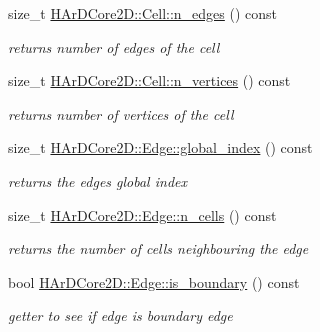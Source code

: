 \begin{DoxyCompactItemize}
\mbox{\label{group__Mesh_ga1b0586610a05e1a7a64bbe11f59e9b19}} 
size\+\_\+t \hyperlink{group__Mesh_ga1b0586610a05e1a7a64bbe11f59e9b19}{H\+Ar\+D\+Core2\+D\+::\+Cell\+::n\+\_\+edges} () const
\begin{DoxyCompactList}\small\item\em returns number of edges of the cell \end{DoxyCompactList}\item 
\mbox{\label{group__Mesh_ga70f9744e4ff553db7f0e147342319f43}} 
size\+\_\+t \hyperlink{group__Mesh_ga70f9744e4ff553db7f0e147342319f43}{H\+Ar\+D\+Core2\+D\+::\+Cell\+::n\+\_\+vertices} () const
\begin{DoxyCompactList}\small\item\em returns number of vertices of the cell \end{DoxyCompactList}\item 
\mbox{\label{group__Mesh_ga774e975ebad5e6bdccf549215293d624}} 
size\+\_\+t \hyperlink{group__Mesh_ga774e975ebad5e6bdccf549215293d624}{H\+Ar\+D\+Core2\+D\+::\+Edge\+::global\+\_\+index} () const
\begin{DoxyCompactList}\small\item\em returns the edges global index \end{DoxyCompactList}\item 
\mbox{\label{group__Mesh_ga0926b705b6169b73293e60e0c48e85f8}} 
size\+\_\+t \hyperlink{group__Mesh_ga0926b705b6169b73293e60e0c48e85f8}{H\+Ar\+D\+Core2\+D\+::\+Edge\+::n\+\_\+cells} () const
\begin{DoxyCompactList}\small\item\em returns the number of cells neighbouring the edge \end{DoxyCompactList}\item 
\mbox{\label{group__Mesh_ga10424f4b99793ab359b5dd099f9255ee}} 
bool \hyperlink{group__Mesh_ga10424f4b99793ab359b5dd099f9255ee}{H\+Ar\+D\+Core2\+D\+::\+Edge\+::is\+\_\+boundary} () const
\begin{DoxyCompactList}\small\item\em getter to see if edge is boundary edge \end{DoxyCompactList}\item 
\mbox{\label{group__Mesh_ga2202a0715196c41356692d8adcfe3893}} 

\end{DoxyCompactItemize}
